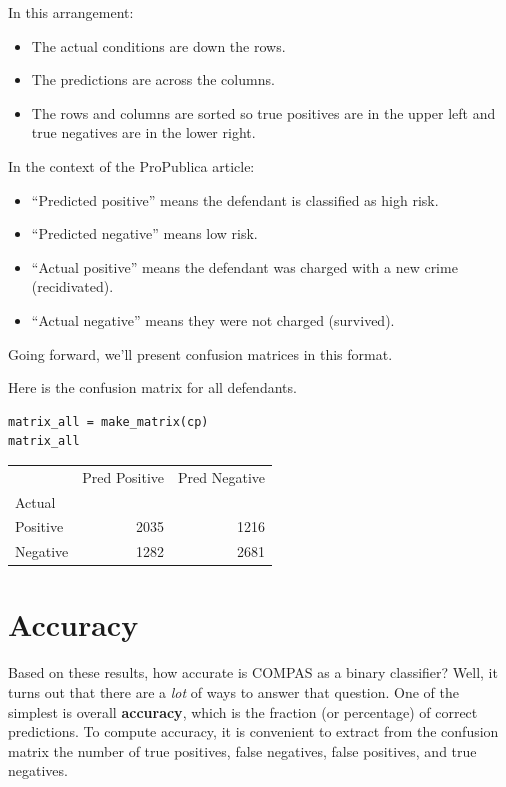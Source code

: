 In this arrangement:

\begin{itemize}
\item
  The actual conditions are down the rows.
\item
  The predictions are across the columns.
\item
  The rows and columns are sorted so true positives are in the upper
  left and true negatives are in the lower right.
\end{itemize}

In the context of the ProPublica article:

\begin{itemize}
\item
  ``Predicted positive'' means the defendant is classified as high risk.
\item
  ``Predicted negative'' means low risk.
\item
  ``Actual positive'' means the defendant was charged with a new crime
  (recidivated).
\item
  ``Actual negative'' means they were not charged (survived).
\end{itemize}

Going forward, we'll present confusion matrices in this format.

Here is the confusion matrix for all defendants.

\begin{lstlisting}[]
matrix_all = make_matrix(cp)
matrix_all
\end{lstlisting}

\begin{tabular}{lrr}
\midrule
{} &  Pred Positive &  Pred Negative \\
Actual   &                &                \\
\midrule
Positive &           2035 &           1216 \\
Negative &           1282 &           2681 \\
\midrule
\end{tabular}

\hypertarget{accuracy}{%
\section{Accuracy}\label{accuracy}}

Based on these results, how accurate is COMPAS as a binary classifier?
Well, it turns out that there are a \emph{lot} of ways to answer that
question. One of the simplest is overall \textbf{accuracy}, which is the
fraction (or percentage) of correct predictions. To compute accuracy, it
is convenient to extract from the confusion matrix the number of true
positives, false negatives, false positives, and true negatives.

